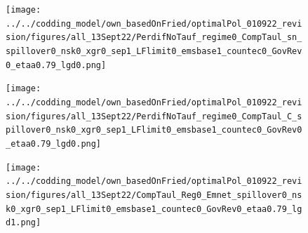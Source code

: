 \begin{figure}[h!!]
\begin{minipage}[]{0.32\textwidth}
\end{minipage}	
\begin{minipage}[]{0.32\textwidth}
\texttt{[image: ../../codding\_model/own\_basedOnFried/optimalPol\_010922\_revision/figures/all\_13Sept22/PerdifNoTauf\_regime0\_CompTaul\_sn\_spillover0\_nsk0\_xgr0\_sep1\_LFlimit0\_emsbase1\_countec0\_GovRev0\_etaa0.79\_lgd0.png]}
\end{minipage}		
\begin{minipage}[]{0.32\textwidth}
\texttt{[image: ../../codding\_model/own\_basedOnFried/optimalPol\_010922\_revision/figures/all\_13Sept22/PerdifNoTauf\_regime0\_CompTaul\_C\_spillover0\_nsk0\_xgr0\_sep1\_LFlimit0\_emsbase1\_countec0\_GovRev0\_etaa0.79\_lgd0.png]}
\end{minipage}	
\begin{minipage}[]{0.32\textwidth}
	\texttt{[image: ../../codding\_model/own\_basedOnFried/optimalPol\_010922\_revision/figures/all\_13Sept22/CompTaul\_Reg0\_Emnet\_spillover0\_nsk0\_xgr0\_sep1\_LFlimit0\_emsbase1\_countec0\_GovRev0\_etaa0.79\_lgd1.png]}
\end{minipage}	
\end{figure}


